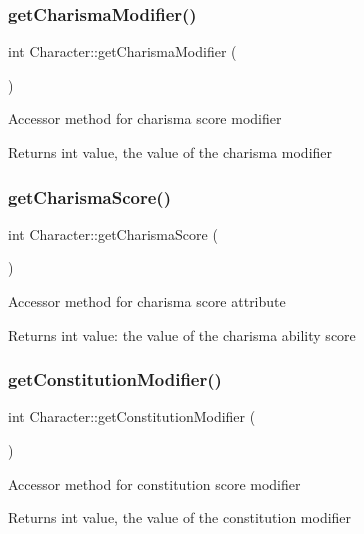 \subsubsection{\texorpdfstring{get\+Charisma\+Modifier()}{getCharismaModifier()}}
{\footnotesize\ttfamily int Character\+::get\+Charisma\+Modifier (\begin{DoxyParamCaption}{ }\end{DoxyParamCaption})}

Accessor method for charisma score modifier \begin{DoxyReturn}{Returns}
int value, the value of the charisma modifier 
\end{DoxyReturn}
\hypertarget{class_character_a359c787d436784878e1f8650ddae3c35}{}\label{class_character_a359c787d436784878e1f8650ddae3c35} 
\subsubsection{\texorpdfstring{get\+Charisma\+Score()}{getCharismaScore()}}
{\footnotesize\ttfamily int Character\+::get\+Charisma\+Score (\begin{DoxyParamCaption}{ }\end{DoxyParamCaption})}

Accessor method for charisma score attribute \begin{DoxyReturn}{Returns}
int value\+: the value of the charisma ability score 
\end{DoxyReturn}
\hypertarget{class_character_a61dd2cf1181a46ddecfdc8dede6fa732}{}\label{class_character_a61dd2cf1181a46ddecfdc8dede6fa732} 
\subsubsection{\texorpdfstring{get\+Constitution\+Modifier()}{getConstitutionModifier()}}
{\footnotesize\ttfamily int Character\+::get\+Constitution\+Modifier (\begin{DoxyParamCaption}{ }\end{DoxyParamCaption})}

Accessor method for constitution score modifier \begin{DoxyReturn}{Returns}
int value, the value of the constitution modifier 
\end{DoxyReturn}
\hypertarget{class_character_abbcc6a78fba81fa02add688b94c06376}{}\label{class_character_abbcc6a78fba81fa02add688b94c06376} 
